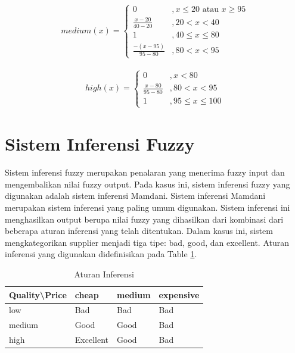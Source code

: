 \documentclass[11pt]{report}
\begin{document}
        \begin{equation}
            \begin{split}
                medium(x) = \begin{cases}
                    0 &, x \le 20 \text{ atau } x \ge 95 \\
                    \frac{x - 20}{40-20} &, 20 < x < 40 \\
                    1 &, 40 \le x \le 80 \\
                    \frac{-(x - 95)}{95-80} &, 80 < x < 95
                \end{cases}
            \end{split}
        \end{equation}

        \begin{equation}
            \begin{split}
                high(x) = \begin{cases}
                    0 &, x < 80 \\
                    \frac{x - 80}{95-80} &, 80 < x < 95 \\
                    1 &, 95 \le x \le 100
                \end{cases}
            \end{split}
        \end{equation}

    \section{Sistem Inferensi Fuzzy}
        Sistem inferensi fuzzy merupakan penalaran yang menerima fuzzy input dan mengembalikan nilai fuzzy output. Pada kasus ini, sistem inferensi fuzzy yang digunakan adalah sistem inferensi Mamdani. Sistem inferensi Mamdani merupakan sistem inferensi yang paling umum digunakan. Sistem inferensi ini menghasilkan output berupa nilai fuzzy yang dihasilkan dari kombinasi dari beberapa aturan inferensi yang telah ditentukan. Dalam kasus ini, sistem mengkategorikan supplier menjadi tiga tipe: bad, good, dan excellent. Aturan inferensi yang digunakan didefinisikan pada Table \ref{tab:Aturan Inferensi}.

        \begin{table}[h!]
            \begin{center}
                \begin{tabular}{@{}llll@{}}
                \toprule
                Quality\textbackslash{}Price & cheap     & medium & expensive \\ \midrule
                low                          & Bad       & Bad    & Bad       \\
                medium                       & Good      & Good   & Bad       \\
                high                         & Excellent & Good   & Bad       \\ \bottomrule
                \end{tabular}
            \end{center}
            \caption{Aturan Inferensi}
            \label{tab:Aturan Inferensi}
        \end{table}
\end{document}
